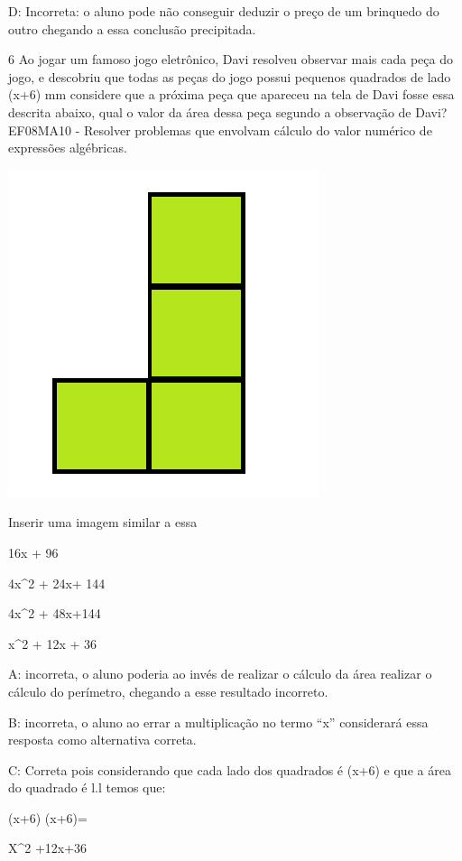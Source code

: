 D: Incorreta: o aluno pode não conseguir deduzir o preço de um brinquedo
do outro chegando a essa conclusão precipitada.

\num{6} Ao jogar um famoso jogo eletrônico, Davi resolveu observar mais cada
peça do jogo, e descobriu que todas as peças do jogo possui pequenos
quadrados de lado (x+6) mm considere que a próxima peça que apareceu na
tela de Davi fosse essa descrita abaixo, qual o valor da área dessa peça
segundo a observação de Davi? EF08MA10 - Resolver problemas que envolvam
cálculo do valor numérico de expressões algébricas.

\includegraphics[width=2\times 05833in,height=2\times 16573in]{./imgSAEB_8_MAT/media/image57.png}

Inserir uma imagem similar a essa

\item 16x + 96
\item 4x^2 + 24x+ 144
\item 4x^2 + 48x+144
\item x^2 + 12x + 36

A: incorreta, o aluno poderia ao invés de realizar o cálculo da área
realizar o cálculo do perímetro, chegando a esse resultado incorreto.

B: incorreta, o aluno ao errar a multiplicação no termo ``x''
considerará essa resposta como alternativa correta.

C: Correta pois considerando que cada lado dos quadrados é (x+6) e que a
área do quadrado é l.l temos que:

(x+6) (x+6)=

X^2 +12x+36

